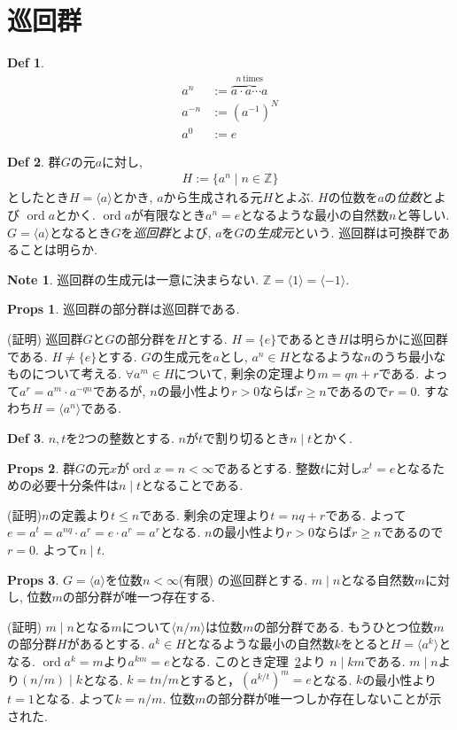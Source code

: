 \documentclass[dvipdfmx]{jsarticle}
\theoremstyle{definition}
\newtheorem{props}{Props}
\newtheorem{definition}{Def}
\newtheorem{note}{Note}
\numberwithin{equation}{section}
\numberwithin{props}{section}
\numberwithin{definition}{section}
\numberwithin{note}{section}
\DeclareMathOperator{\ord}{ord}
\begin{document}
\section{巡回群}
\begin{definition}
     \begin{align}
          a^n    & :=\overbrace{a\cdot a\cdots a}^{n\,\mathrm{times}} \\
          a^{-n} & :=(a^{-1})^N                                       \\
          a^0    & :=e
     \end{align}
\end{definition}
\begin{definition}
     群$G$の元$a$に対し,
     \begin{align}
          H:=\lbrace a^n\mid n\in \mathbb{Z}\rbrace
     \end{align}
     としたとき$H=\langle a\rangle$とかき, $a$から生成される元$H$とよぶ. $H$の位数を$a$の\emph{位数}とよび $\ord a$とかく. $\ord a$が有限なとき$a^n=e$となるような最小の自然数$n$と等しい. $G=\langle a\rangle$となるとき$G$を\emph{巡回群}とよび, $a$を$G$の\emph{生成元}という. 巡回群は可換群であることは明らか.
\end{definition}
\begin{note}
     巡回群の生成元は一意に決まらない. $\mathbb{Z}=\langle 1\rangle=\langle-1\rangle$.
\end{note}
\begin{props}
     巡回群の部分群は巡回群である.
\end{props}
(証明) 巡回群$G$と$G$の部分群を$H$とする. $H=\lbrace e\rbrace$であるとき$H$は明らかに巡回群である.
$H\neq \lbrace e\rbrace$とする. $G$の生成元を$a$とし, $a^n\in H$となるような$n$のうち最小なものについて考える. $\forall a^m \in H$について, 剰余の定理より$m=qn+r$である.
よって$a^r= a^m\cdot a^{-qn}$であるが, $n$の最小性より$r>0$ならば$r\geq n$であるので$r=0$.
すなわち$H=\langle a^n\rangle$である.
\begin{definition}
     $n,t$を2つの整数とする. $n$が$t$で割り切るとき$n\mid t$とかく.
\end{definition}
\begin{props}\label{them::n|t}
     群$G$の元$x$が$\ord  x=n <\infty$であるとする. 整数$t$に対し$x^t=e$となるための必要十分条件は$n\mid t$となることである.
\end{props}
(証明)$n$の定義より$t\leq n$である. 剰余の定理より$t=nq+r$である. よって$e=a^t=a^{nq}\cdot a^r=e\cdot a^r=a^r$となる. $n$の最小性より$r> 0$ならば$r\geq n$であるので$r=0$. よって$n\mid t$.
\begin{props}
     $G=\langle a\rangle$を位数$n<\infty$(有限) の巡回群とする. $m\mid n$となる自然数$m$に対し, 位数$m$の部分群が唯一つ存在する.
\end{props}
(証明) $m\mid n$となる$m$について$\langle n/m\rangle$は位数$m$の部分群である. もうひとつ位数$m$の部分群$H$があるとする. $a^k\in H$となるような最小の自然数$k$をとると$H=\langle a^k \rangle$となる. $\ord  a^k=m$より$a^{km}=e$となる. このとき定理~\ref{them::n|t}より $n\mid km$である. $m\mid n$より$(n/m)\mid k$となる. $k= tn/m$とすると，$(a^{k/t})^m=e$となる. $k$の最小性より$t=1$となる. よって$k=n/m$. 位数$m$の部分群が唯一つしか存在しないことが示された.
\end{document}
